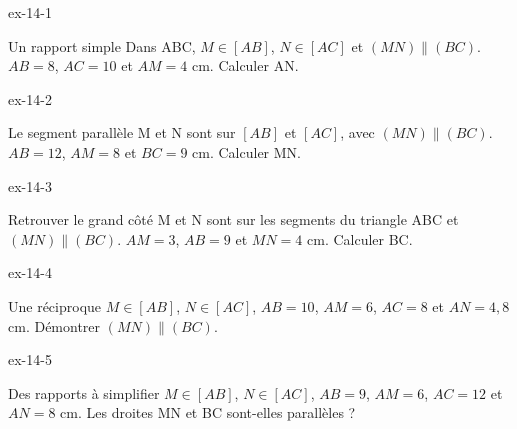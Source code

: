 \clearpage{}
\begin{blocLivre}{ex-14-1}\begin{exercice}[1]{Un rapport simple}
Dans ABC, $M\in[AB]$, $N\in[AC]$ et $(MN)\parallel(BC)$. $AB=8$, $AC=10$ et $AM=4$ cm. Calculer AN.
\label{fig-ex-14-1}
\end{exercice}\end{blocLivre}
\begin{blocLivre}{ex-14-2}\begin{exercice}[1]{Le segment parallèle}
M et N sont sur $[AB]$ et $[AC]$, avec $(MN)\parallel(BC)$. $AB=12$, $AM=8$ et $BC=9$ cm. Calculer MN.
\label{fig-ex-14-2}
\end{exercice}\end{blocLivre}
\begin{blocLivre}{ex-14-3}\begin{exercice}[1]{Retrouver le grand côté}
M et N sont sur les segments du triangle ABC et $(MN)\parallel(BC)$. $AM=3$, $AB=9$ et $MN=4$ cm. Calculer BC.
\label{fig-ex-14-3}
\end{exercice}\end{blocLivre}
\begin{blocLivre}{ex-14-4}\begin{exercice}[1]{Une réciproque}
$M\in[AB]$, $N\in[AC]$, $AB=10$, $AM=6$, $AC=8$ et $AN=4{,}8$ cm. Démontrer $(MN)\parallel(BC)$.
\label{fig-ex-14-4}
\end{exercice}\end{blocLivre}
\begin{blocLivre}{ex-14-5}\begin{exercice}[1]{Des rapports à simplifier}
$M\in[AB]$, $N\in[AC]$, $AB=9$, $AM=6$, $AC=12$ et $AN=8$ cm. Les droites MN et BC sont-elles parallèles ?
\label{fig-ex-14-5}
\end{exercice}\end{blocLivre}

